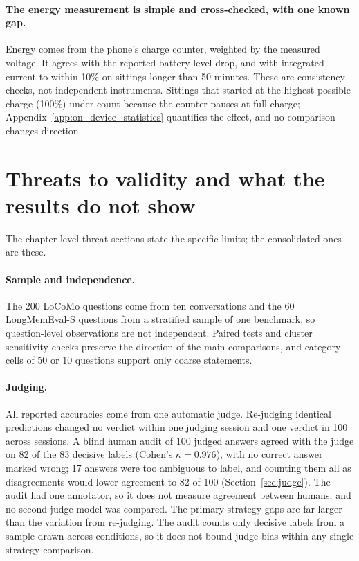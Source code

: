 \paragraph{The energy measurement is simple and cross-checked, with one known gap.}
Energy comes from the phone's charge counter, weighted by the measured voltage. It agrees with the
reported battery-level drop, and with integrated current to within 10\% on sittings longer than 50
minutes. These are consistency checks, not independent instruments. Sittings that started at the
highest possible charge (100\%) under-count because the counter pauses at full charge; Appendix~\ref{app:on_device_statistics}
quantifies the effect, and no comparison changes direction.

\section{Threats to validity and what the results do not show}
\label{sec:ch9_threats}
\label{sec:ch9_not_shown}

The chapter-level threat sections state the specific limits; the consolidated ones are these.

\paragraph{Sample and independence.}
The 200 LoCoMo questions come from ten conversations and the 60 LongMemEval-S questions from a
stratified sample of one benchmark, so question-level observations are not independent. Paired tests
and cluster sensitivity checks preserve the direction of the main comparisons, and category cells of
50 or 10 questions support only coarse statements.

\paragraph{Judging.}
All reported accuracies come from one automatic judge. Re-judging identical predictions changed no
verdict within one judging session and one verdict in 100 across sessions. A blind human audit of
100 judged answers agreed with the judge on 82 of the 83 decisive labels (Cohen's $\kappa=0.976$),
with no correct answer marked wrong; 17 answers were too ambiguous to label, and counting them all as
disagreements would lower agreement to 82 of 100 (Section~\ref{sec:judge}). The audit had one
annotator, so it does not measure agreement between humans, and no second judge model was compared.
The primary strategy gaps are far larger than the variation from re-judging. The audit counts only
decisive labels from a sample drawn across conditions, so it does not bound judge bias within any
single strategy comparison.

